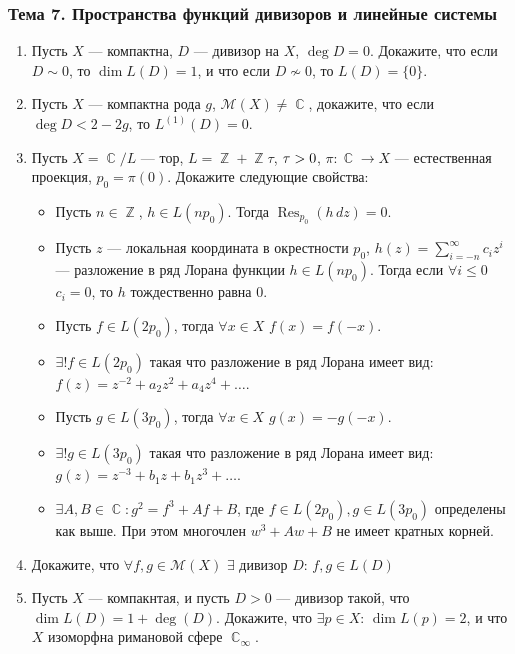 \documentclass[a4paper, 12pt]{article}
\DeclareMathOperator{\ZZ}{\mathbb{Z}}
\DeclareMathOperator{\CC}{\mathbb{C}}
\let\Im\relax
\DeclareMathOperator{\Im}{Im}
\DeclareMathOperator{\Res}{Res}
\begin{document}
\subsubsection{Тема 7. Пространства функций дивизоров и линейные системы}

\begin{enumerate}[noitemsep,topsep=0pt]
    \item Пусть $X$ --- компактна, $D$ --- дивизор на $X$, $\deg D = 0$. Докажите, что если $D \sim 0$, то $\dim L(D) = 1$, и что если $D \not\sim 0$, то $L(D) = \{0\}$. %
    \item Пусть $X$ --- компактна рода $g$, $\mathcal{M}(X)\neq \CC$, докажите, что если $\deg D < 2-2g$, то $L^{(1)}(D)=0$. %
    \item Пусть $X=\CC/L$ --- тор, $L=\ZZ+\ZZ \tau$, $\Im \tau >0$, $\pi:\CC\rightarrow X$ --- естественная проекция, $p_0=\pi(0)$. Докажите следующие свойства:
    \begin{itemize}[noitemsep,topsep=0pt]
        \item Пусть $n\in\ZZ$, $h\in L(n p_0)$. Тогда $\Res_{p_0}(h\,dz)=0$.
        \item Пусть $z$ --- локальная координата в окрестности $p_0$, $h(z)=\sum_{i=-n}^\infty c_i z^i$ --- разложение в ряд Лорана функции $h\in L(n p_0)$. Тогда если $\forall i\leqslant 0$ $c_i=0$, то $h$ тождественно равна $0$.
        \item Пусть $f\in L(2 p_0)$, тогда $\forall x \in X$ $f(x)=f(-x)$.
        \item $\exists! f\in L(2 p_0)$ такая что разложение в ряд Лорана имеет вид: $f(z)=z^{-2} + a_2z^2 + a_4 z^4 + \dots$.
        \item Пусть $g\in L(3 p_0)$, тогда $\forall x \in X$ $g(x)=-g(-x)$.
        \item $\exists! g\in L(3 p_0)$ такая что разложение в ряд Лорана имеет вид: $g(z)=z^{-3} + b_1 z + b_1 z^3 + \dots$.
        \item $\exists A,B\in\CC: g^2=f^3+Af+B$, где $f\in L(2 p_0), g\in L(3 p_0)$ определены как выше. При этом многочлен $w^3+A w + B$ не имеет кратных корней.
    \end{itemize}%
    \item Докажите, что $\forall f,g \in \mathcal{M}(X)$ $\exists$ дивизор $D$: $f,g\in L(D)$ %
    \item Пусть $X$ --- компакнтая, и пусть $D>0$ --- дивизор такой, что $\dim L(D)=1+\deg(D)$. Докажите, что $\exists p\in X$: $\dim L(p)=2$, и что $X$ изоморфна римановой сфере $\CC_\infty$. %

\end{enumerate}
\end{document}
